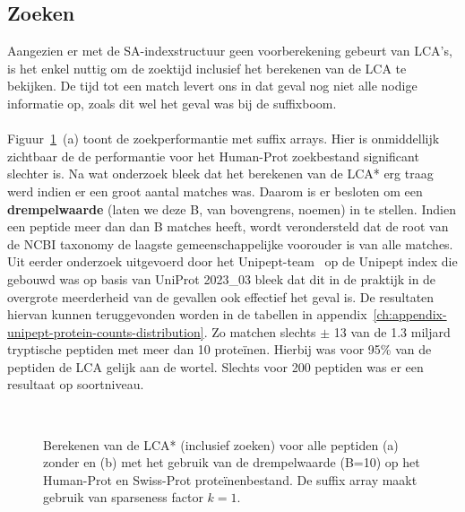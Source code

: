 \subsection{Zoeken}\label{subsec:zoeken}
Aangezien er met de SA-indexstructuur geen voorberekening gebeurt van LCA's, is het enkel nuttig om de zoektijd inclusief het berekenen van de LCA te bekijken.
De tijd tot een match levert ons in dat geval nog niet alle nodige informatie op, zoals dit wel het geval was bij de suffixboom.
\\ \\
Figuur~\ref{fig:cutoff_humanprot}~(a) toont de zoekperformantie met suffix arrays.
Hier is onmiddellijk zichtbaar de de performantie voor het Human-Prot zoekbestand significant slechter is.
Na wat onderzoek bleek dat het berekenen van de LCA* erg traag werd indien er een groot aantal matches was.
Daarom is er besloten om een \textbf{drempelwaarde} (laten we deze B, van bovengrens, noemen) in te stellen.
Indien een peptide meer dan dan B matches heeft, wordt verondersteld dat de root van de NCBI taxonomy de laagste gemeenschappelijke voorouder is van alle matches.
Uit eerder onderzoek uitgevoerd door het Unipept-team~\cite{unipept_cutoff} op de Unipept index die gebouwd was op basis van UniProt 2023\_03 bleek dat dit in de praktijk in de overgrote meerderheid van de gevallen ook effectief het geval is.
De resultaten hiervan kunnen teruggevonden worden in de tabellen in appendix~\ref{ch:appendix-unipept-protein-counts-distribution}.
Zo matchen slechts $\pm$ 13 van de 1.3 miljard tryptische peptiden met meer dan 10 proteïnen.
Hierbij was voor 95\% van de peptiden de LCA gelijk aan de wortel.
Slechts voor 200 peptiden was er een resultaat op soortniveau.
\\
\begin{figure}[H]
    \centering
    \\[4ex] %

    \caption{Berekenen van de LCA* (inclusief zoeken) voor alle peptiden (a) zonder en (b) met het gebruik van de drempelwaarde (B=10) op het Human-Prot en Swiss-Prot proteïnenbestand. De suffix array maakt gebruik van sparseness factor $k = 1$.}\label{fig:cutoff_humanprot}
\end{figure}

